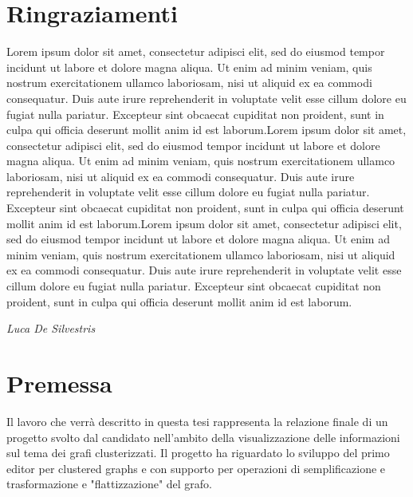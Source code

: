 \section{Ringraziamenti}
\label{sec:ringraziamenti}

Lorem ipsum dolor sit amet, consectetur adipisci elit, sed do eiusmod tempor incidunt ut labore et dolore magna aliqua. Ut enim ad minim veniam, quis nostrum exercitationem ullamco laboriosam, nisi ut aliquid ex ea commodi consequatur. Duis aute irure reprehenderit in voluptate velit esse cillum dolore eu fugiat nulla pariatur. Excepteur sint obcaecat cupiditat non proident, sunt in culpa qui officia deserunt mollit anim id est laborum.Lorem ipsum dolor sit amet, consectetur adipisci elit, sed do eiusmod tempor incidunt ut labore et dolore magna aliqua. Ut enim ad minim veniam, quis nostrum exercitationem ullamco laboriosam, nisi ut aliquid ex ea commodi consequatur. Duis aute irure reprehenderit in voluptate velit esse cillum dolore eu fugiat nulla pariatur. Excepteur sint obcaecat cupiditat non proident, sunt in culpa qui officia deserunt mollit anim id est laborum.Lorem ipsum dolor sit amet, consectetur adipisci elit, sed do eiusmod tempor incidunt ut labore et dolore magna aliqua. Ut enim ad minim veniam, quis nostrum exercitationem ullamco laboriosam, nisi ut aliquid ex ea commodi consequatur. Duis aute irure reprehenderit in voluptate velit esse cillum dolore eu fugiat nulla pariatur. Excepteur sint obcaecat cupiditat non proident, sunt in culpa qui officia deserunt mollit anim id est laborum.
   \begin{flushright}
   	\textit{Luca De Silvestris}
   \end{flushright} 
\newpage
\section{Premessa}
Il lavoro che verr\`a descritto in questa tesi rappresenta la relazione finale di un progetto svolto dal candidato nell'ambito della visualizzazione delle informazioni sul tema dei grafi clusterizzati. Il progetto ha riguardato lo sviluppo del primo editor per clustered graphs e con supporto per operazioni di semplificazione e trasformazione e "flattizzazione" del grafo.

